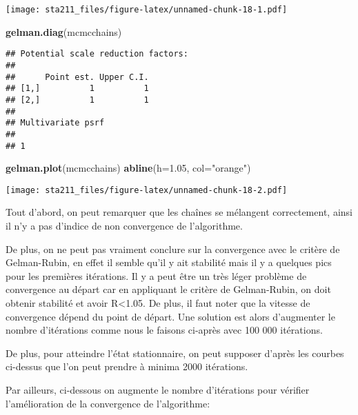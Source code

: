 \documentclass[
]{article}
\newenvironment{Shaded}{\begin{snugshade}}{\end{snugshade}}
\newcommand{\DataTypeTok}[1]{\textcolor[rgb]{0.13,0.29,0.53}{#1}}
\newcommand{\FloatTok}[1]{\textcolor[rgb]{0.00,0.00,0.81}{#1}}
\newcommand{\KeywordTok}[1]{\textcolor[rgb]{0.13,0.29,0.53}{\textbf{#1}}}
\newcommand{\NormalTok}[1]{#1}
\newcommand{\StringTok}[1]{\textcolor[rgb]{0.31,0.60,0.02}{#1}}
\begin{document}
\texttt{[image: sta211\_files/figure-latex/unnamed-chunk-18-1.pdf]}

\begin{Shaded}
\begin{Highlighting}[]
\KeywordTok{gelman.diag}\NormalTok{(mcmcchains)}
\end{Highlighting}
\end{Shaded}

\begin{verbatim}
## Potential scale reduction factors:
## 
##      Point est. Upper C.I.
## [1,]          1          1
## [2,]          1          1
## 
## Multivariate psrf
## 
## 1
\end{verbatim}

\begin{Shaded}
\begin{Highlighting}[]
\KeywordTok{gelman.plot}\NormalTok{(mcmcchains)}
\KeywordTok{abline}\NormalTok{(}\DataTypeTok{h=}\FloatTok{1.05}\NormalTok{, }\DataTypeTok{col=}\StringTok{"orange"}\NormalTok{)}
\end{Highlighting}
\end{Shaded}

\texttt{[image: sta211\_files/figure-latex/unnamed-chunk-18-2.pdf]}

Tout d'abord, on peut remarquer que les chaînes se mélangent
correctement, ainsi il n'y a pas d'indice de non convergence de
l'algorithme.

De plus, on ne peut pas vraiment conclure sur la convergence avec le
critère de Gelman-Rubin, en effet il semble qu'il y ait stabilité mais
il y a quelques pics pour les premières itérations. Il y a peut être un
très léger problème de convergence au départ car en appliquant le
critère de Gelman-Rubin, on doit obtenir stabilité et avoir
R\textless1.05. De plus, il faut noter que la vitesse de convergence
dépend du point de départ. Une solution est alors d'augmenter le nombre
d'itérations comme nous le faisons ci-après avec 100 000 itérations.

De plus, pour atteindre l'état stationnaire, on peut supposer d'après
les courbes ci-dessus que l'on peut prendre à minima 2000 itérations.

Par ailleurs, ci-dessous on augmente le nombre d'itérations pour
vérifier l'amélioration de la convergence de l'algorithme:
\end{document}
